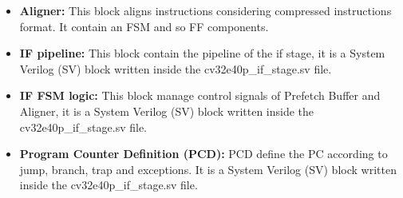 {{{\begin{itemize}
        	    \item \textbf{Aligner:} This block aligns instructions considering compressed instructions format. It contain an FSM and so FF components.
        	    
        	    \item \textbf{IF pipeline:} This block contain the pipeline of the if stage, it is a System Verilog (SV) block written inside the cv32e40p\_if\_stage.sv file.
        	    
        	    \item \textbf{IF FSM logic:} This block manage control signals of Prefetch Buffer and Aligner, it is a System Verilog (SV) block written inside the cv32e40p\_if\_stage.sv file.
        	    
        	    \item \textbf{Program Counter Definition (PCD):} PCD define the PC according to jump, branch, trap and exceptions. It is a System Verilog (SV) block written inside the cv32e40p\_if\_stage.sv file.
                
        	\end{itemize}
		}
		
	}%

		

}